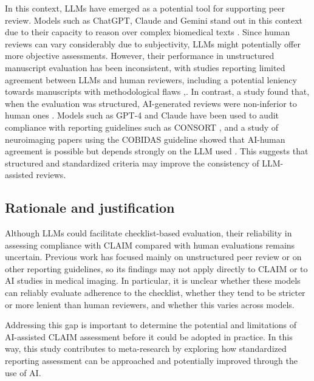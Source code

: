 In this context, LLMs have emerged as a potential tool for supporting peer review. Models such as ChatGPT, Claude and Gemini  stand out in this context due to their capacity to reason over complex biomedical texts \cite{thirunavukarasu-2023}. Since human reviews can vary considerably due to subjectivity, LLMs might potentially offer more objective assessments. However, their performance in unstructured manuscript evaluation has been inconsistent, with studies reporting limited agreement between LLMs and human reviewers, including a potential leniency towards manuscripts with methodological flaws \cite{saad-2024},\cite{suleiman-2024}. In contrast, a study found that, when the evaluation was structured, AI-generated reviews were non-inferior to human ones \cite{zancanaro-2026}. Models such as GPT-4 and Claude have been used to audit compliance with reporting guidelines such as CONSORT \cite{tsybulnik-2026}, and a study of neuroimaging papers using the COBIDAS guideline showed that AI-human agreement is possible but depends strongly on the LLM used \cite{pluimer-2026}. This suggests that structured and standardized criteria may improve the consistency of LLM-assisted reviews.

\subsection{Rationale and justification}
Although LLMs could facilitate checklist-based evaluation, their reliability in assessing compliance with CLAIM compared with human evaluations remains uncertain. Previous work has focused mainly on unstructured peer review or on other reporting guidelines, so its findings may not apply directly to CLAIM or to AI studies in medical imaging. In particular, it is unclear whether these models can reliably evaluate adherence to the checklist, whether they tend to be stricter or more lenient than human reviewers, and whether this varies across models.

Addressing this gap is important to determine the potential and limitations of AI-assisted CLAIM assessment before it could be adopted in practice. In this way, this study contributes to meta-research by exploring how standardized reporting assessment can be approached and potentially improved through the use of AI.


  

